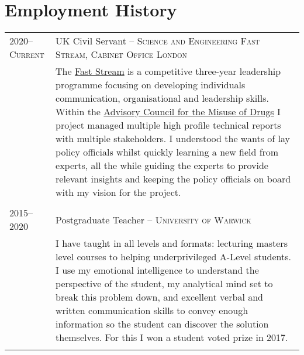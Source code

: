 \documentclass[a4paper,10pt]{article}
\begin{document}
\section{Employment History}
\begin{tabular}{p{2.25cm}|p{15cm}}
	\textsc{2020--Current} & UK Civil Servant -- \textsc{Science and Engineering Fast Stream, Cabinet Office London}\\&\footnotesize{The \href{https://www.faststream.gov.uk/}{Fast Stream} is a competitive three-year leadership programme focusing on developing individuals communication, organisational and leadership skills. Within the \href{https://www.gov.uk/government/organisations/advisory-council-on-the-misuse-of-drugs}{Advisory Council for the Misuse of Drugs} I project managed multiple high profile technical reports with multiple stakeholders. I understood the wants of lay policy officials whilst quickly learning a new field from experts, all the while guiding the experts to provide relevant insights and keeping the policy officials on board with my vision for the project.}\\\multicolumn{2}{c}{} \\
	\textsc{2015--2020} & Postgraduate Teacher -- \textsc{University of Warwick}\\&\footnotesize{I have taught in all levels and formats: lecturing masters level courses to helping underprivileged A-Level students. I use my emotional intelligence to understand the perspective of the student, my analytical mind set to break this problem down, and excellent verbal and written communication skills to convey enough information so the student can discover the solution themselves. For this I won a student voted prize in 2017.}\\\multicolumn{2}{c}{}
\end{tabular}
\vspace{-0.8cm}
\end{document}
